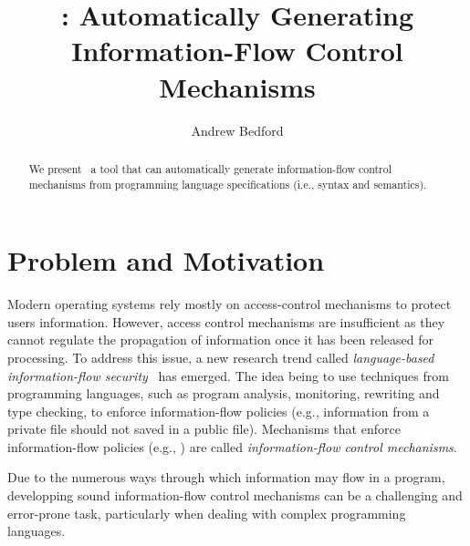 \documentclass[sigplan,10pt]{acmart}\settopmatter{printfolios=true,printccs=false,printacmref=false}
\begin{document}
\title[ott-ifc]{\ottifc: Automatically Generating Information-Flow Control Mechanisms}


\author{Andrew Bedford}


\begin{abstract}
We present \ottifc\, a tool that can automatically generate information-flow control mechanisms from programming language specifications (i.e., syntax and semantics).
\end{abstract}

\maketitle

\section{Problem and Motivation}
Modern operating systems rely mostly on access-control mechanisms to protect users information. However, access control mechanisms are insufficient as they cannot regulate the propagation of information once it has been released for processing. To address this issue, a new research trend called \emph{language-based information-flow security}~\cite{DBLP:journals/jsac/SabelfeldM03} has emerged. The idea being to use techniques from programming languages, such as program analysis, monitoring, rewriting and type checking, to enforce information-flow policies (e.g., information from a private file should not saved in a public file). Mechanisms that enforce information-flow policies (e.g., \cite{DBLP:journals/compsec/BedfordCDKT17}) are called \emph{information-flow control mechanisms}. 

Due to the numerous ways through which information may flow in a program, developping sound information-flow control mechanisms can be a challenging and error-prone task, particularly when dealing with complex programming languages.

\end{document}
